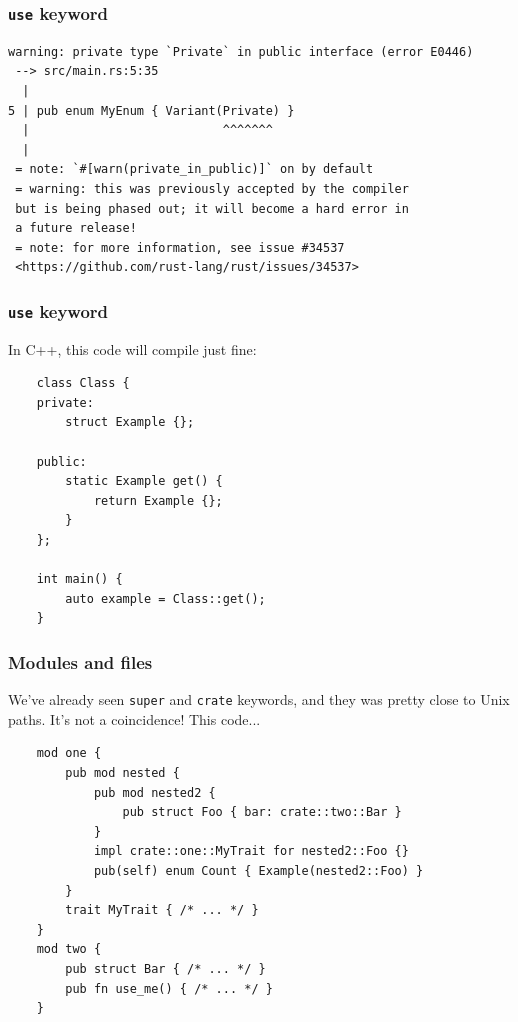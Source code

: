 \documentclass[aspectratio=1610,t]{beamer}
\begin{document}

\begin{frame}[fragile]
\frametitle{\texttt{use} keyword}
\begin{verbatim}
warning: private type `Private` in public interface (error E0446)
 --> src/main.rs:5:35
  |
5 | pub enum MyEnum { Variant(Private) }
  |                           ^^^^^^^
  |
 = note: `#[warn(private_in_public)]` on by default
 = warning: this was previously accepted by the compiler
 but is being phased out; it will become a hard error in
 a future release!
 = note: for more information, see issue #34537
 <https://github.com/rust-lang/rust/issues/34537>
\end{verbatim}
\end{frame}


\begin{frame}[fragile]
\frametitle{\texttt{use} keyword}
In C++, this code will compile just fine:

\begin{verbatim}
    class Class {
    private:
        struct Example {};
    
    public:
        static Example get() {
            return Example {};
        }
    };
    
    int main() {
        auto example = Class::get();
    }
\end{verbatim}
\end{frame}


\begin{frame}[fragile,c]
\frametitle{Modules and files}
We've already seen \texttt{super} and \texttt{crate} keywords, and they was pretty close to Unix paths. It's not a coincidence! This code...

\begin{verbatim}
    mod one {
        pub mod nested {
            pub mod nested2 {
                pub struct Foo { bar: crate::two::Bar }
            }
            impl crate::one::MyTrait for nested2::Foo {}
            pub(self) enum Count { Example(nested2::Foo) }
        }
        trait MyTrait { /* ... */ }
    }
    mod two {
        pub struct Bar { /* ... */ }
        pub fn use_me() { /* ... */ }
    }
\end{verbatim}
\end{frame}
\end{document}
